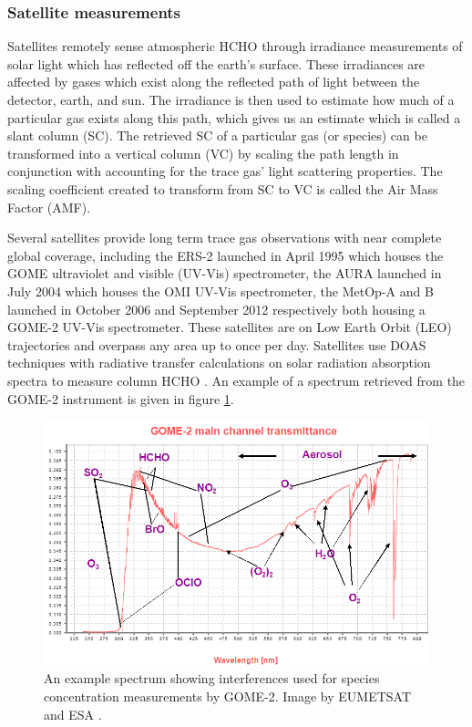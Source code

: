     \subsubsection{Satellite measurements}
      \label{LR:HCHO:Sat}
      
      Satellites remotely sense atmospheric HCHO through irradiance measurements of solar light which has reflected off the earth's surface. 
      These irradiances are affected by gases which exist along the reflected path of light between the detector, earth, and sun. 
      The irradiance is then used to estimate how much of a particular gas exists along this path, which gives us an estimate which is called a slant column (SC).
      The retrieved SC of a particular gas (or species) can be transformed into a vertical column (VC) by scaling the path length in conjunction with accounting for the trace gas' light scattering properties.
      The scaling coefficient created to transform from SC to VC is called the Air Mass Factor (AMF).
      
      Several satellites provide long term trace gas observations with near complete global coverage, including the ERS-2 launched in April 1995 which houses the GOME ultraviolet and visible (UV-Vis) spectrometer, the AURA launched in July 2004 which houses the OMI UV-Vis spectrometer, the MetOp-A and B launched in October 2006 and September 2012 respectively both housing a GOME-2 UV-Vis spectrometer.
      These satellites are on Low Earth Orbit (LEO) trajectories and overpass any area up to once per day.
      Satellites use DOAS techniques with radiative transfer calculations on solar radiation absorption spectra to measure column HCHO .
      An example of a spectrum retrieved from the GOME-2 instrument is given in figure \ref{LR:HCHO:Sat:fig_GOME_products}.
      
      \begin{figure}
        \includegraphics[width=\textwidth]{Figures/GOME_SPECTRUM.jpg}
        \caption{%
          An example spectrum showing interferences used for species concentration measurements by GOME-2. Image by EUMETSAT and ESA \parencite{GOME2Image}.
          }
        \label{LR:HCHO:Sat:fig_GOME_products}
      \end{figure}
      
